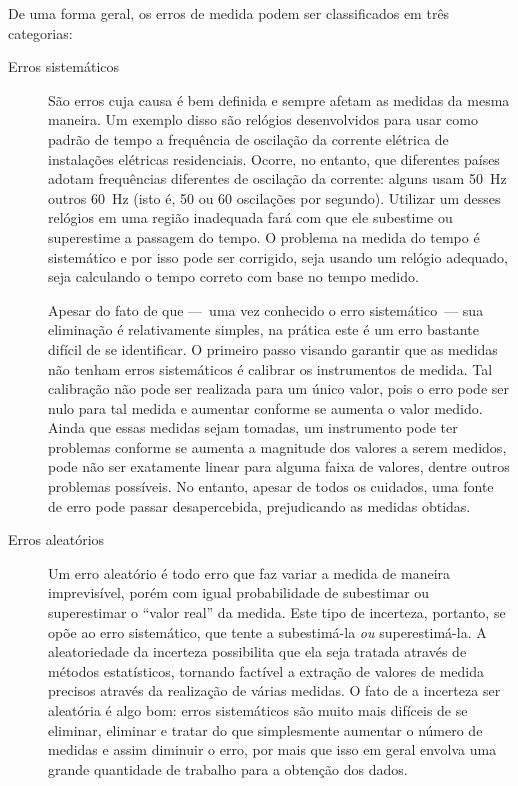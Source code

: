 De uma forma geral, os erros de medida podem ser classificados em três categorias\cite{LivroAmarelo}\cite{LivroEAD}:
\begin{description}
\item[Erros sistemáticos] São erros cuja causa é bem definida e sempre afetam as medidas da mesma maneira. Um exemplo disso são relógios desenvolvidos para usar como padrão de tempo a frequência de oscilação da corrente elétrica de instalações elétricas residenciais. Ocorre, no entanto, que diferentes países adotam frequências diferentes de oscilação da corrente: alguns usam 50~Hz outros 60~Hz (isto é, 50 ou 60 oscilações por segundo). Utilizar um desses relógios em uma região inadequada fará com que ele subestime ou superestime a passagem do tempo. O problema na medida do tempo é sistemático e por isso pode ser corrigido, seja usando um relógio adequado, seja calculando o tempo correto com base no tempo medido.

Apesar do fato de que ---~uma vez conhecido o erro sistemático~--- sua eliminação é relativamente simples, na prática este é um erro bastante difícil de se identificar. O primeiro passo visando garantir que as medidas não tenham erros sistemáticos é calibrar os instrumentos de medida. Tal calibração não pode ser realizada para um único valor, pois o erro pode ser nulo para tal medida e aumentar conforme se aumenta o valor medido. Ainda que essas medidas sejam tomadas, um instrumento pode ter problemas conforme se aumenta a magnitude dos valores a serem medidos, pode não ser exatamente linear para alguma faixa de valores, dentre outros problemas possíveis. No entanto, apesar de todos os cuidados, uma fonte de erro pode passar desapercebida, prejudicando as medidas obtidas.

\item[Erros aleatórios] Um erro aleatório é todo erro que faz variar a medida de maneira imprevisível, porém com igual probabilidade de subestimar ou superestimar o ``valor real'' da medida. Este tipo de incerteza, portanto, se opõe ao erro sistemático, que tente a subestimá-la \emph{ou} superestimá-la. A aleatoriedade da incerteza possibilita que ela seja tratada através de métodos estatísticos, tornando factível a extração de valores de medida precisos através da realização de várias medidas. O fato de a incerteza ser aleatória é algo bom: erros sistemáticos são muito mais difíceis de se eliminar, eliminar e tratar do que simplesmente aumentar o número de medidas e assim diminuir o erro, por mais que isso em geral envolva uma grande quantidade de trabalho para a obtenção dos dados.


\end{description}
